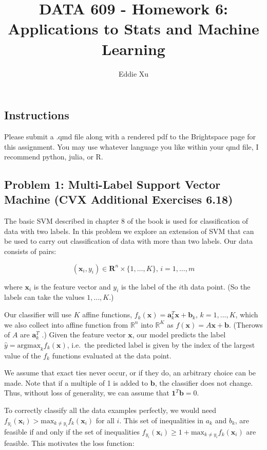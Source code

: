 \documentclass[
  letterpaper,
  DIV=11,
  numbers=noendperiod]{scrartcl}
\title{DATA 609 - Homework 6: Applications to Stats and Machine
Learning}
\author{Eddie Xu}
\date{}
\begin{document}
\maketitle


\subsection{Instructions}\label{instructions}

Please submit a .qmd file along with a rendered pdf to the Brightspace
page for this assignment. You may use whatever language you like within
your qmd file, I recommend python, julia, or R.

\subsection{Problem 1: Multi-Label Support Vector Machine (CVX
Additional Exercises
6.18)}\label{problem-1-multi-label-support-vector-machine-cvx-additional-exercises-6.18}

The basic SVM described in chapter 8 of the book is used for
classification of data with two labels. In this problem we explore an
extension of SVM that can be used to carry out classification of data
with more than two labels. Our data consists of pairs:

\[
(\mathbf{x}_i , y_i ) \in \mathbf{R}^n \times \{1, \dots , K\},\, i = 1, \dots , m
\]

where \(\mathbf{x}_i\) is the feature vector and \(y_i\) is the label of
the \(i\)th data point. (So the labels can take the values
\(1, \dots , K\).)

Our classifier will use \(K\) affine functions,
\(f_k(\mathbf{x}) = \mathbf{a}^T_k \mathbf{x} + \mathbf{b}_k\),
\(k = 1, . . . , K\), which we also collect into affine function from
\(\mathbb{R}^n\) into \(\mathbb{R}^K\) as
\(f(\mathbf{x}) = A\mathbf{x} + \mathbf{b}\). (Therows of \(A\) are
\(\mathbf{a}^T_k\) .) Given the feature vector \(\mathbf{x}\), our model
predicts the label \(\hat{y} = \mathrm{argmax}_k f_k (\mathbf{x})\),
i.e.~the predicted label is given by the index of the largest value of
the \(f_k\) functions evaluated at the data point.

We assume that exact ties never occur, or if they do, an arbitrary
choice can be made. Note that if a multiple of 1 is added to
\(\mathbf{b}\), the classifier does not change. Thus, without loss of
generality, we can assume that \(\mathbf{1}^T \mathbf{b} = 0\).

To correctly classify all the data examples perfectly, we would need
\(f_{y_i} (\mathbf{x}_i ) > \mathrm{max}_{k\neq y_i} f_k (\mathbf{x}_i )\)
for all \(i\). This set of inequalities in \(a_k\) and \(b_k\), are
feasible if and only if the set of inequalities
\(f_{y_i} (\mathbf{x}_i ) \geq 1 + \mathrm{max}_{k\neq y_i} f_k (\mathbf{x}_i )\)
are feasible. This motivates the loss function:
\end{document}

